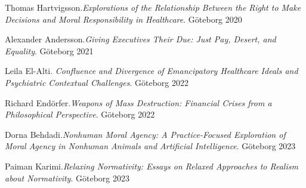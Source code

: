 \documentclass[fontsize=14pt,
               paper=297mm:210mm,
               twoside,
               pagesize=pdftex,
               DIV=calc
]{scrbook}
\begin{document}
\begin{multicols*}{2}
\begin{Volumes}
\item Thomas Hartvigsson.\enspace\textit{Explorations of the Relationship Between the Right to Make Decisions and Moral Responsibility in Healthcare}. \mbox{G\"oteborg} 2020

\item Alexander Andersson.\enspace\textit{Giving Executives Their Due: Just Pay, Desert, and Equality}. \mbox{G\"oteborg} 2021

\item Leila El-Alti.\enspace\textit{ Confluence and Divergence of Emancipatory Healthcare Ideals and Psychiatric Contextual Challenges}. \mbox{G\"oteborg} 2022

\item Richard End\"orfer.\enspace\textit{Weapons of Mass Destruction: Financial Crises from a Philosophical Perspective}. \mbox{G\"oteborg} 2022

\item Dorna Behdadi.\enspace\textit{Nonhuman Moral Agency: A Practice-Focused Exploration of Moral Agency in Nonhuman Animals and Artificial Intelligence}. \mbox{G\"oteborg} 2023

\item Paiman Karimi.\enspace\textit{Relaxing Normativity: Essays on Relaxed Approaches to Realism about Normativity}. \mbox{G\"oteborg} 2023
\end{Volumes}
\end{multicols*}
\end{document}
